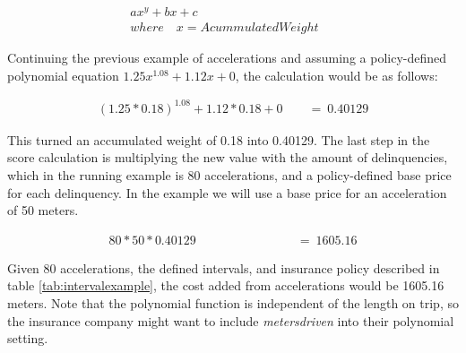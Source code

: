 \begin{align*}
ax^{y} + bx + c\quad \quad \quad \quad \quad \quad \quad \quad \quad \quad \quad \\
where\quad x = AcummulatedWeight
\end{align*}

Continuing the previous example of accelerations and assuming a policy-defined polynomial equation $1.25x^{1.08} +  1.12x + 0$, the calculation would be as follows:

\begin{align*}
(1.25 * 0.18)^{1.08} +  1.12 * 0.18 + 0\quad \quad  =\ 0.40129
\end{align*}

This turned an accumulated weight of 0.18 into 0.40129. The last step in the score calculation is multiplying the new value with the amount of delinquencies, which in the running example is 80 accelerations, and a policy-defined base price for each delinquency. In the example we will use a base price for an acceleration of 50 meters.

\begin{align*}
80 * 50 * 0.40129\quad \quad \quad \quad \quad \quad \quad \quad =\ 1605.16
\end{align*}


Given 80 accelerations, the defined intervals, and insurance policy described in table \ref{tab:intervalexample}, the cost added from accelerations would be 1605.16 meters. Note that the polynomial function is independent of the length on trip, so the insurance company might want to include \textit{metersdriven} into their polynomial setting.